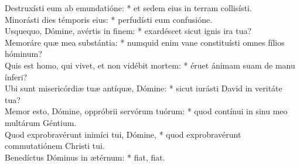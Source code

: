 {	Destruxísti eum ab emundatióne: * et sedem eius in terram collisísti. \\
	Minorásti dies témporis eius: * perfudísti eum confusióne. \\
	Usquequo, Dómine, avértis in finem: * exardéscet sicut ignis ira tua? \\
	Memoráre quæ mea substántia: * numquid enim vane constituísti omnes fílios hóminum? \\
	Quis est homo, qui vivet, et non vidébit mortem: * éruet ánimam suam de manu ínferi? \\
	Ubi sunt misericórdiæ tuæ antíquæ, Dómine: * sicut iurásti David in veritáte tua? \\
	Memor esto, Dómine, oppróbrii servórum tuórum: * quod contínui in sinu meo multárum Géntium. \\
	Quod exprobravérunt inimíci tui, Dómine, * quod exprobravérunt commutatiónem Christi tui. \\
	Benedíctus Dóminus in ætérnum: * fiat, fiat.
}

